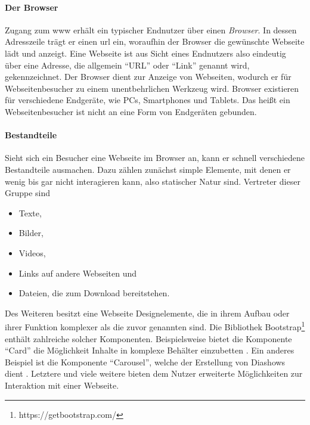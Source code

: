             \paragraph*{Der Browser}
            Zugang zum \gls{www} erhält ein typischer Endnutzer über einen \textit{Browser}.
            In dessen Adresszeile trägt er einen \gls{url} ein,
            woraufhin der Browser die gewünschte Webseite lädt und anzeigt.
            Eine Webseite ist aus Sicht eines Endnutzers also eindeutig über eine
            Adresse, die allgemein "`URL"' oder "`Link"' genannt wird, gekennzeichnet.
            Der Browser dient zur Anzeige von Webseiten, wodurch er für Webseitenbesucher
            zu einem unentbehrlichen Werkzeug wird.
            Browser existieren für verschiedene Endgeräte,
            wie PCs, Smartphones und Tablets.
            Das heißt ein Webseitenbesucher ist nicht an eine Form von Endgeräten gebunden.

            \paragraph*{Bestandteile}
            Sieht sich ein Besucher eine Webseite im Browser an,
            kann er schnell verschiedene Bestandteile ausmachen.
            Dazu zählen zunächst simple Elemente, mit denen er wenig bis gar nicht
            interagieren kann, also statischer Natur sind.
            Vertreter dieser Gruppe sind

            \begin{itemize}
                \item Texte,
                \item Bilder,
                \item Videos,
                \item Links auf andere Webseiten und
                \item Dateien, die zum Download bereitstehen.
            \end{itemize}

            Des Weiteren besitzt eine Webseite Designelemente,
            die in ihrem Aufbau oder ihrer Funktion komplexer
            als die zuvor genannten sind.
            Die Bibliothek Bootstrap\footnote{https://getbootstrap.com/}
            enthält zahlreiche solcher Komponenten.
            Beispielsweise bietet die Komponente "`Card"' die Möglichkeit
            Inhalte in komplexe Behälter einzubetten \cite{bootstrap:Cards}.
            Ein anderes Beispiel ist die Komponente "`Carousel"',
            welche der Erstellung von Diashows dient \cite{bootstrap:Carousel}.
            Letztere und viele weitere bieten dem Nutzer
            erweiterte Möglichkeiten zur Interaktion mit einer Webseite.

